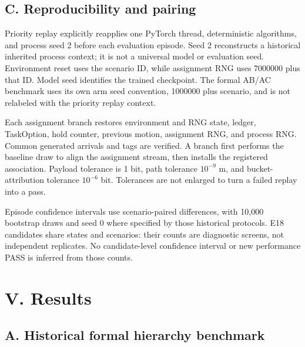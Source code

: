 \subsection*{C. Reproducibility and pairing}

Priority replay explicitly reapplies one PyTorch thread, deterministic algorithms, and process seed 2 before each evaluation episode. Seed 2 reconstructs a historical inherited process context; it is not a universal model or evaluation seed. Environment reset uses the scenario ID, while assignment RNG uses 7000000 plus that ID. Model seed identifies the trained checkpoint. The formal AB/AC benchmark uses its own arm seed convention, 1000000 plus scenario, and is not relabeled with the priority replay context.

Each assignment branch restores environment and RNG state, ledger, TaskOption, hold counter, previous motion, assignment RNG, and process RNG. Common generated arrivals and tags are verified. A branch first performs the baseline draw to align the assignment stream, then installs the registered association. Payload tolerance is 1 bit, path tolerance $10^{-9}$ m, and bucket-attribution tolerance $10^{-6}$ bit. Tolerances are not enlarged to turn a failed replay into a pass.

Episode confidence intervals use scenario-paired differences, with 10,000 bootstrap draws and seed 0 where specified by those historical protocols. E18 candidates share states and scenarios: their counts are diagnostic screens, not independent replicates. No candidate-level confidence interval or new performance PASS is inferred from those counts.

\section*{V. Results}

\subsection*{A. Historical formal hierarchy benchmark}

